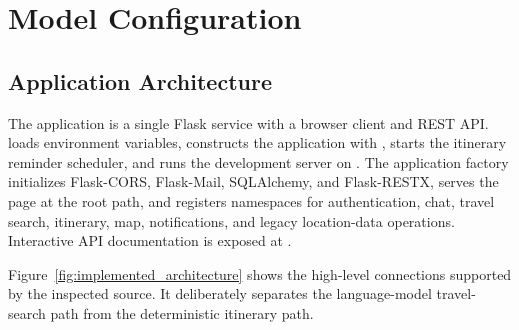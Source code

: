 \chapter{Model Configuration}
\label{chap:model_configuration}

\section{Application Architecture}

The application is a single Flask service with a browser client and REST API.  loads environment variables, constructs the application with , starts the itinerary reminder scheduler, and runs the development server on . The application factory initializes Flask-CORS, Flask-Mail, SQLAlchemy, and Flask-RESTX, serves the  page at the root path, and registers namespaces for authentication, chat, travel search, itinerary, map, notifications, and legacy location-data operations. Interactive API documentation is exposed at .

Figure~\ref{fig:implemented_architecture} shows the high-level connections supported by the inspected source. It deliberately separates the language-model travel-search path from the deterministic itinerary path.


